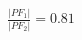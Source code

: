 \documentclass[preview]{standalone}
\begin{document}
\begin{align*}
\frac{|PF_1|}{|PF_2|} = 0.81
\end{align*}
\end{document}

